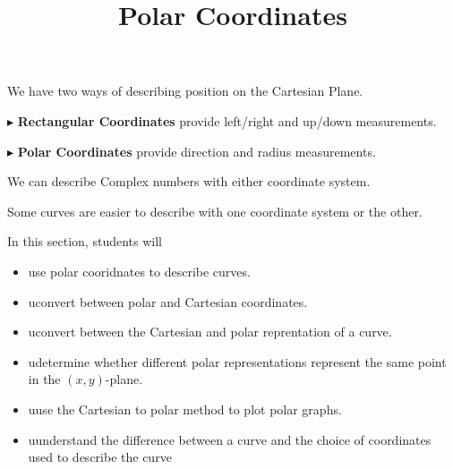 \documentclass{ximera}
\title{Polar Coordinates}
\begin{document}
\begin{abstract}
\end{abstract}
\maketitle





We have two ways of describing position on the Cartesian Plane.


$\blacktriangleright$ \textbf{Rectangular Coordinates} provide left/right and up/down measurements.





$\blacktriangleright$ \textbf{Polar Coordinates} provide direction and radius measurements.




We can describe Complex numbers with either coordinate system.


Some curves are easier to describe with one coordinate system or the other.




\begin{sectionOutcomes}
In this section, students will 

\begin{itemize}
\item use polar cooridnates to describe curves.
\item uconvert between polar and Cartesian coordinates.
\item uconvert between the Cartesian and polar reprentation of a curve.
\item udetermine whether different polar representations represent the same point in the $(x,y)$-plane.
\item uuse the Cartesian to polar method to plot polar graphs.
\item uunderstand the difference between a curve and the choice of coordinates used to describe the curve
\end{itemize}
\end{sectionOutcomes}
\end{document}
